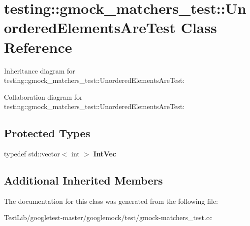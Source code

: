 \hypertarget{classtesting_1_1gmock__matchers__test_1_1UnorderedElementsAreTest}{}\section{testing\+:\+:gmock\+\_\+matchers\+\_\+test\+:\+:Unordered\+Elements\+Are\+Test Class Reference}
\label{classtesting_1_1gmock__matchers__test_1_1UnorderedElementsAreTest}


Inheritance diagram for testing\+:\+:gmock\+\_\+matchers\+\_\+test\+:\+:Unordered\+Elements\+Are\+Test\+:


Collaboration diagram for testing\+:\+:gmock\+\_\+matchers\+\_\+test\+:\+:Unordered\+Elements\+Are\+Test\+:
\subsection*{Protected Types}
\begin{DoxyCompactItemize}
\item 
\mbox{\label{classtesting_1_1gmock__matchers__test_1_1UnorderedElementsAreTest_a608750c71652943bd11fe7bb5281588d}} 
typedef std\+::vector$<$ int $>$ {\bfseries Int\+Vec}
\end{DoxyCompactItemize}
\subsection*{Additional Inherited Members}


The documentation for this class was generated from the following file\+:\begin{DoxyCompactItemize}
\item 
Test\+Lib/googletest-\/master/googlemock/test/gmock-\/matchers\+\_\+test.\+cc\end{DoxyCompactItemize}
